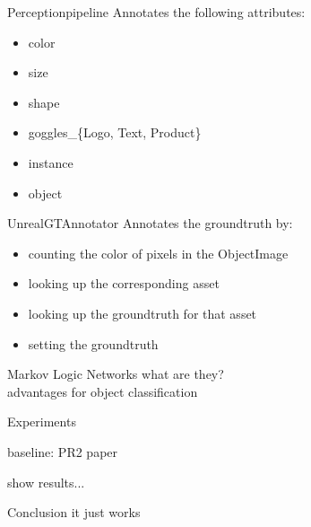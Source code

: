 \documentclass[]{beamer}
\begin{document}
\begin{frame}{Perceptionpipeline}
Annotates the following attributes:
	\begin{itemize}
		\item color
		\item size
		\item shape
		\item goggles\_\{Logo, Text, Product\}
		\item instance
		\item object
	\end{itemize}
\end{frame}

\begin{frame}{UnrealGTAnnotator}
Annotates the groundtruth by:
	\begin{itemize}
		\item counting the color of pixels in the ObjectImage
		\item looking up the corresponding asset 
		\item looking up the groundtruth for that asset
		\item setting the groundtruth 
	\end{itemize}

\end{frame}


\begin{frame}{Markov Logic Networks}
what are they?\\
advantages for object classification
\end{frame}

\begin{frame}{Experiments}

baseline: PR2 paper

show results...

\end{frame}


\begin{frame}{Conclusion}
it just works
\end{frame}
\end{document}
